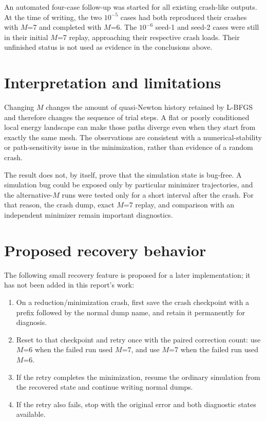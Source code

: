 \documentclass[11pt]{article}
\newcommand{\code}[1]{\path{#1}}
\newcommand{\M}{\ensuremath{M}}
\newcommand{\lbfgs}{L-BFGS}
\begin{document}
An automated four-case follow-up was started for all existing crash-like outputs.  At the time of writing, the two $10^{-5}$ cases had both reproduced their crashes with \M=7 and completed with \M=6.  The $10^{-6}$ seed-1 and seed-2 cases were still in their initial \M=7 replay, approaching their respective crash loads.  Their unfinished status is not used as evidence in the conclusions above.

\section{Interpretation and limitations}

Changing \M{} changes the amount of quasi-Newton history retained by \lbfgs{} and therefore changes the sequence of trial steps.  A flat or poorly conditioned local energy landscape can make those paths diverge even when they start from exactly the same mesh.  The observations are consistent with a numerical-stability or path-sensitivity issue in the minimization, rather than evidence of a random crash.

The result does not, by itself, prove that the simulation state is bug-free.  A simulation bug could be exposed only by particular minimizer trajectories, and the alternative-\M{} runs were tested only for a short interval after the crash.  For that reason, the crash dump, exact \M=7 replay, and comparison with an independent minimizer remain important diagnostics.

\section{Proposed recovery behavior}

The following small recovery feature is proposed for a later implementation; it has not been added in this report's work:

\begin{enumerate}
  \item On a reduction/minimization crash, first save the crash checkpoint with a \code{crash_} prefix followed by the normal dump name, and retain it permanently for diagnosis.
  \item Reset to that checkpoint and retry once with the paired correction count: use \M=6 when the failed run used \M=7, and use \M=7 when the failed run used \M=6.
  \item If the retry completes the minimization, resume the ordinary simulation from the recovered state and continue writing normal dumps.
  \item If the retry also fails, stop with the original error and both diagnostic states available.
\end{enumerate}
\end{document}
